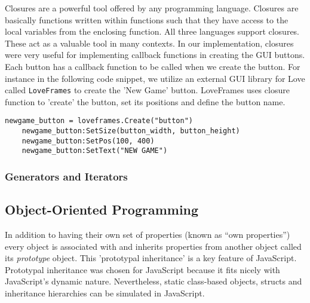 Closures are a powerful tool offered by any programming language. Closures are basically functions written within functions such that they have access to the local variables from the enclosing function. All three languages support closures. These act as a valuable tool in many contexts. In our implementation, closures were very useful for implementing callback functions in creating the GUI buttons. Each button has a callback function to be called when we create the button. For instance in the following code snippet, we utilize an external GUI library for Love called \texttt{LoveFrames} to create the 'New Game' button. LoveFrames uses closure function to 'create' the button, set its positions and define the button name.
\begin{lstlisting}[language={[5.2]Lua},caption=Declaring and initializing metatables in Lua]
newgame_button = loveframes.Create("button")
    newgame_button:SetSize(button_width, button_height)
    newgame_button:SetPos(100, 400)
    newgame_button:SetText("NEW GAME")
\end{lstlisting}


\subsubsection{Generators and Iterators}


\subsection{Object-Oriented Programming}
\label{oop}


In addition to having their own set of properties (known as ``own properties'') every
object is associated with and inherits properties from another object called its
\emph{prototype} object. This 'prototypal inheritance' is a key feature of JavaScript.
Prototypal inheritance was chosen for JavaScript because it fits nicely with JavaScript's
dynamic nature. Nevertheless, static class-based
objects, structs and inheritance hierarchies can be simulated in JavaScript. 

